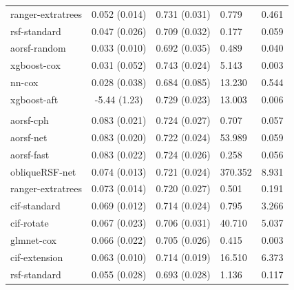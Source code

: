 \documentclass[twoside,11pt]{article}\usepackage[]{graphicx}\usepackage[]{xcolor}
\newenvironment{knitrout}{}{} %
\begin{document}
\begin{knitrout}
\begin{longtable}[t]{lcclc}
\hspace{1em}ranger-extratrees & 0.052 (0.014) & 0.731 (0.031) & 0.779 & 0.461\\
\hspace{1em}rsf-standard & 0.047 (0.026) & 0.709 (0.032) & 0.177 & 0.059\\
\hspace{1em}aorsf-random & 0.033 (0.010) & 0.692 (0.035) & 0.489 & 0.040\\
\hspace{1em}xgboost-cox & 0.031 (0.052) & 0.743 (0.024) & 5.143 & 0.003\\
\hspace{1em}nn-cox & 0.028 (0.038) & 0.684 (0.085) & 13.230 & 0.544\\
\hspace{1em}xgboost-aft & -5.44 (1.23) & 0.729 (0.023) & 13.003 & 0.006\\
\addlinespace[0.3em]
\hline
\multicolumn{5}{l}{\textit{\textbf{GUIDE-IT; HF hospitalization, n = 894, p = 59}}}\\
\hline
\hspace{1em}aorsf-cph & 0.083 (0.021) & 0.724 (0.027) & 0.707 & 0.057\\
\hspace{1em}aorsf-net & 0.083 (0.020) & 0.722 (0.024) & 53.989 & 0.059\\
\hspace{1em}aorsf-fast & 0.083 (0.022) & 0.724 (0.026) & 0.258 & 0.056\\
\hspace{1em}obliqueRSF-net & 0.074 (0.013) & 0.721 (0.024) & 370.352 & 8.931\\
\hspace{1em}ranger-extratrees & 0.073 (0.014) & 0.720 (0.027) & 0.501 & 0.191\\
\hspace{1em}cif-standard & 0.069 (0.012) & 0.714 (0.024) & 0.795 & 3.266\\
\hspace{1em}cif-rotate & 0.067 (0.023) & 0.706 (0.031) & 40.710 & 5.037\\
\hspace{1em}glmnet-cox & 0.066 (0.022) & 0.705 (0.026) & 0.415 & 0.003\\
\hspace{1em}cif-extension & 0.063 (0.010) & 0.714 (0.019) & 16.510 & 6.373\\
\hspace{1em}rsf-standard & 0.055 (0.028) & 0.693 (0.028) & 1.136 & 0.117\\

\end{longtable}
\end{knitrout}
\end{document}
